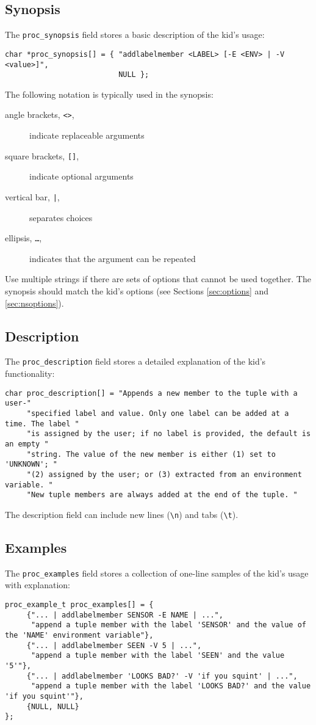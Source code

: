 \documentclass[11pt]{article}
\begin{document}
\subsection{Synopsis}\label{sec:synopsis}
The \texttt{proc\_synopsis} field stores a basic description of the kid's usage:
\begin{lstlisting}
char *proc_synopsis[] = { "addlabelmember <LABEL> [-E <ENV> | -V <value>]", 
                          NULL };
\end{lstlisting}
The following notation is typically used in the synopsis:
\begin{description}
\item[angle brackets, \texttt{<>},] indicate replaceable arguments
\item[square brackets, \texttt{[]},] indicate optional arguments
\item[vertical bar, \texttt{|},] separates choices
\item[ellipsis, \texttt{\ldots},] indicates that the argument can be repeated
\end{description}
Use multiple strings if there are sets of options that cannot be used together. The synopsis should match the kid's
options (see Sections \ref{sec:options} and \ref{sec:nsoptions}).

\subsection{Description}
The \texttt{proc\_description} field stores a detailed explanation of the kid's functionality:
\begin{lstlisting}
char proc_description[] = "Appends a new member to the tuple with a user-"
     "specified label and value. Only one label can be added at a time. The label "
     "is assigned by the user; if no label is provided, the default is an empty "
     "string. The value of the new member is either (1) set to 'UNKNOWN'; "
     "(2) assigned by the user; or (3) extracted from an environment variable. "
     "New tuple members are always added at the end of the tuple. "
\end{lstlisting}
The description field can include new lines (\verb+\n+) and tabs (\verb+\t+).

\subsection{Examples}
The \texttt{proc\_examples} field stores a collection of one-line samples of the kid's usage with explanation:
\begin{lstlisting}
proc_example_t proc_examples[] = {
     {"... | addlabelmember SENSOR -E NAME | ...",
      "append a tuple member with the label 'SENSOR' and the value of the 'NAME' environment variable"},
     {"... | addlabelmember SEEN -V 5 | ...",
      "append a tuple member with the label 'SEEN' and the value '5'"},
     {"... | addlabelmember 'LOOKS BAD?' -V 'if you squint' | ...",
      "append a tuple member with the label 'LOOKS BAD?' and the value 'if you squint'"},
     {NULL, NULL}
};
\end{lstlisting}
\end{document}
